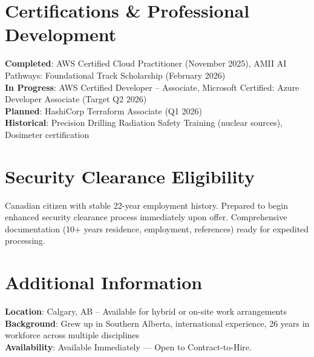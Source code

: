 \documentclass[letterpaper,11pt]{article}
\begin{document}
\section{Certifications \& Professional Development}
 \begin{itemize}[leftmargin=0.15in, label={}]
    \small{\item{
     \textbf{Completed}{: AWS Certified Cloud Practitioner (November 2025), AMII AI Pathways: Foundational Track Scholarship (February 2026)} \\
     \textbf{In Progress}{: AWS Certified Developer -- Associate, Microsoft Certified: Azure Developer Associate (Target Q2 2026)} \\
     \textbf{Planned}{: HashiCorp Terraform Associate (Q1 2026)} \\
     \textbf{Historical}{: Precision Drilling Radiation Safety Training (nuclear sources), Dosimeter certification}
    }}
 \end{itemize}


\section{Security Clearance Eligibility}
 \begin{itemize}[leftmargin=0.15in, label={}]
    \small{\item{
     Canadian citizen with stable 22-year employment history. Prepared to begin enhanced security clearance process immediately upon offer. Comprehensive documentation (10+ years residence, employment, references) ready for expedited processing.
    }}
 \end{itemize}


\section{Additional Information}
 \begin{itemize}[leftmargin=0.15in, label={}]
    \small{\item{
     \textbf{Location}{: Calgary, AB -- Available for hybrid or on-site work arrangements} \\
     \textbf{Background}{: Grew up in Southern Alberta, international experience, 26 years in workforce across multiple disciplines} \\
     \textbf{Availability}{: Available Immediately --- Open to Contract-to-Hire.}
    }}
 \end{itemize}

\vfill

\end{document}
